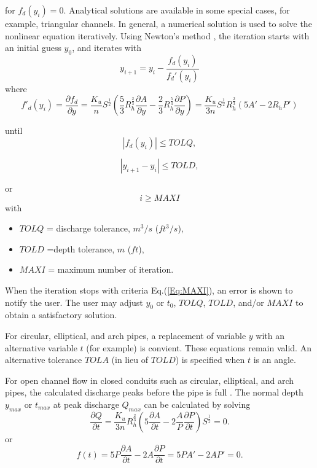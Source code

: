 \noindent for $f_d(y_{i}) = 0$. Analytical solutions are available in some special cases, for example, triangular channels. In general, a numerical solution is used to solve the nonlinear equation iteratively. Using Newton's method \cite{Strang1991}, the iteration starts with an initial guess $y_0$, and iterates with
\begin{equation}  
y_{i+1} = y_i -\frac{f_d(y_{i})}{f_d'(y_{i})}
\end{equation}
where
\begin{equation}  
f'_d(y_{i})=\frac{\partial f_d}{\partial y}= \frac{K_u}{n}S^{\frac{1}{2}}\left(\frac{5}{3}R_h^{\frac{2}{3}}\frac{\partial A}{\partial y} -  \frac{2}{3}R_h^{\frac{5}{3}}\frac{\partial P}{\partial y}\right) = \frac{K_u}{3n}S^{\frac{1}{2}}R_h^{\frac{2}{3}}\left(5A' -  2R_hP'\right)
\end{equation}

\noindent until 
\begin{equation}  
|f_d(y_{i})| \leq TOLQ, 
\label{Eq:TOLQ}
\end{equation}

\begin{equation}  
|y_{i+1} - y_i| \leq TOLD, 
\label{Eq:TOLD}
\end{equation}

\noindent or 
\begin{equation}  
i \geq MAXI 
\label{Eq:MAXI}
\end{equation}
with 
\begin{itemize}
\item[] $TOLQ$ = discharge tolerance, $m^3/s$ ($ft^3/s$),
\item[] $TOLD$ =depth tolerance, $m$ ($ft$),
\item[] $MAXI$ = maximum number of iteration.
\end{itemize}

\noindent When the iteration stops with criteria Eq.(\ref{Eq:MAXI}), an error is shown to notify the user. The user may adjust $y_0$ or $t_0$, $TOLQ$, $TOLD$, and/or $MAXI$ to obtain a satisfactory solution. 

\noindent For circular, elliptical, and arch pipes, a replacement of variable $y$ with an alternative variable $t$ (for example) is convient. These equations remain valid. An alternative tolerance $TOLA$ (in lieu of $TOLD$) is specified when $t$ is an angle.

For open channel flow in closed conduits such as circular, elliptical, and arch pipes, the calculated discharge peaks before the pipe is full \cite{Chow1959,French1985,Munson2013}. 
The normal depth $y_{max}$ or $t_{max}$ at peak discharge $Q_{max}$ can be calculated by solving
\begin{equation}  
\frac{\partial Q}{\partial t} = \frac{K_u}{3n} R_h^{\frac{2}{3}} \left(5\frac{\partial A}{\partial t} -  2 \frac{A}{P}\frac{\partial P}{\partial t}\right) S^{\frac{1}{2}}=0.
\end{equation}
or
\begin{equation}  
f(t) = 5P\frac{\partial A}{\partial t} -  2 A\frac{\partial P}{\partial t} = 5PA' -  2 AP' = 0.
\label{Eq:MaxQ}
\end{equation}

